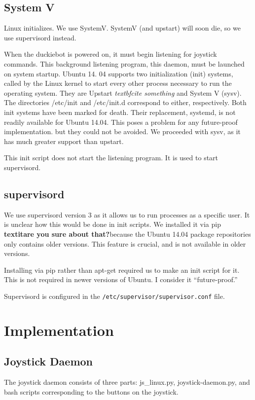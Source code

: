 \documentclass[titlepage]{article}
\begin{document}
\subsection{System V}
Linux initializes. We use SystemV. SystemV (and upstart) will soon die, so we use supervisord instead. 

When the duckiebot is powered on, it must begin listening for joystick commands. This background listening program, this daemon, must be launched on system startup. Ubuntu 14. 04 supports two initialization (init) systems, called by the Linux kernel to start every other process necessary to run the operating system. They are Upstart \textit{textbf{cite something}} and System V (sysv). The directories /etc/init and /etc/init.d correspond to either, respectively. Both init systems have been marked for death. Their replacement, systemd, is not readily available for Ubuntu 14.04. This poses a problem for any future-proof implementation. but they could not be avoided. We proceeded with sysv, as it has much greater support than upstart. 


This init script does not start the listening program. It is used to start supervisord. 
\subsection{supervisord}

We use supervisord version 3 as it allows us to run processes as a specific user. It is unclear how this would be done in init scripts. We installed it via pip \textbf{textit{are you sure about that?}}because the Ubuntu 14.04 package repositories only contains older versions. This feature is crucial, and is not available in older versions. 

Installing via pip rather than apt-get required us to make an init script for it. This is not required in newer versions of Ubuntu. I consider it ``future-proof.''

Supervisord is configured in the \texttt{/etc/supervisor/supervisor.conf} file.
\section{Implementation}
\subsection{Joystick Daemon}
The joystick daemon consists of three parts: js\_linux.py, joystick-daemon.py, and bash scripts corresponding to the buttons on the joystick.  
\end{document}
